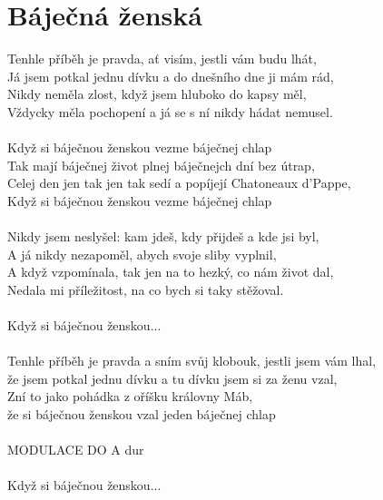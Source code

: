 \section{Báječná ženská}
Tenhle příběh je pravda, ať visím, jestli vám budu lhát,\\
Já jsem potkal jednu dívku a do dnešního dne ji mám rád,\\
Nikdy neměla zlost, když jsem hluboko do kapsy měl,\\
Vždycky měla pochopení a já se s ní nikdy hádat nemusel.\\
\\
Když si báječnou ženskou vezme báječnej chlap\\
Tak mají báječnej život plnej báječnejch dní bez útrap,\\
Celej den jen tak jen tak sedí a popíjejí Chatoneaux d'Pappe,\\
Když si báječnou ženskou vezme báječnej chlap\\
\\
Nikdy jsem neslyšel: kam jdeš, kdy přijdeš a kde jsi byl,\\
A já nikdy nezapoměl, abych svoje sliby vyplnil,\\
A když vzpomínala, tak jen na to hezký, co nám život dal,\\
Nedala mi příležitost, na co bych si taky stěžoval.\\
\\
Když si báječnou ženskou...\\
\\
Tenhle příběh je pravda a sním svůj klobouk, jestli jsem vám lhal,\\
že jsem potkal jednu dívku a tu dívku jsem si za ženu vzal,\\
Zní to jako pohádka z oříšku královny Máb,\\
že si báječnou ženskou vzal jeden báječnej chlap\\
\\
MODULACE DO A dur\\
\\
Když si báječnou ženskou...\\
